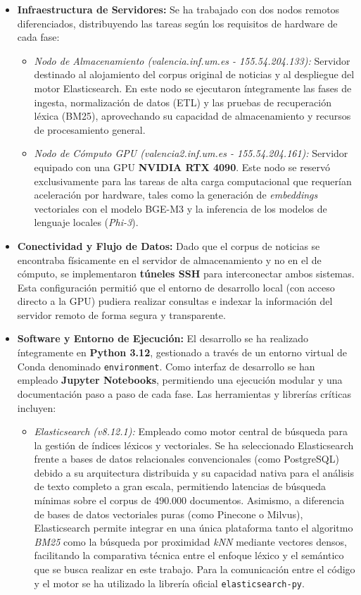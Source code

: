 \begin{itemize}
    \item \textbf{Infraestructura de Servidores:} Se ha trabajado con dos nodos remotos diferenciados, distribuyendo las tareas según los requisitos de hardware de cada fase:
    \begin{itemize}
        \item \textit{Nodo de Almacenamiento (valencia.inf.um.es - 155.54.204.133):} Servidor destinado al alojamiento del corpus original de noticias y al despliegue del motor Elasticsearch. En este nodo se ejecutaron íntegramente las fases de ingesta, normalización de datos (ETL) y las pruebas de recuperación léxica (BM25), aprovechando su capacidad de almacenamiento y recursos de procesamiento general.
        \item \textit{Nodo de Cómputo GPU (valencia2.inf.um.es - 155.54.204.161):} Servidor equipado con una GPU \textbf{NVIDIA RTX 4090}. Este nodo se reservó exclusivamente para las tareas de alta carga computacional que requerían aceleración por hardware, tales como la generación de \textit{embeddings} vectoriales con el modelo BGE-M3 y la inferencia de los modelos de lenguaje locales (\textit{Phi-3}).
    \end{itemize}
    \item \textbf{Conectividad y Flujo de Datos:} Dado que el corpus de noticias se encontraba físicamente en el servidor de almacenamiento y no en el de cómputo, se implementaron \textbf{túneles SSH} para interconectar ambos sistemas. Esta configuración permitió que el entorno de desarrollo local (con acceso directo a la GPU) pudiera realizar consultas e indexar la información del servidor remoto de forma segura y transparente.
    \item \textbf{Software y Entorno de Ejecución:} El desarrollo se ha realizado íntegramente en \textbf{Python 3.12}, gestionado a través de un entorno virtual de Conda denominado \texttt{environment}. Como interfaz de desarrollo se han empleado \textbf{Jupyter Notebooks}, permitiendo una ejecución modular y una documentación paso a paso de cada fase. Las herramientas y librerías críticas incluyen:
    \begin{itemize}
        \item \textit{Elasticsearch (v8.12.1):} Empleado como motor central de búsqueda para la gestión de índices léxicos y vectoriales. Se ha seleccionado Elasticsearch frente a bases de datos relacionales convencionales (como PostgreSQL) debido a su arquitectura distribuida y su capacidad nativa para el análisis de texto completo a gran escala, permitiendo latencias de búsqueda mínimas sobre el corpus de 490.000 documentos. Asimismo, a diferencia de bases de datos vectoriales puras (como Pinecone o Milvus), Elasticsearch permite integrar en una única plataforma tanto el algoritmo \textit{BM25} como la búsqueda por proximidad \textit{kNN} mediante vectores densos, facilitando la comparativa técnica entre el enfoque léxico y el semántico que se busca realizar en este trabajo. Para la comunicación entre el código y el motor se ha utilizado la librería oficial \texttt{elasticsearch-py}.

\end{itemize}
\end{itemize}
